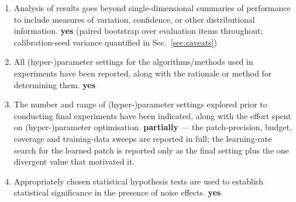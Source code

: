 \documentclass[manuscript, screen, review]{jair}
\begin{document}
\begin{enumerate}
      unsuccessful or unsatisfactory experiments. \textbf{yes} --- rejected
      ideas are reported in Sec.~\ref{sec:negative} with their pre-registered
      promotion rules, and four claims made during the study are explicitly
      retracted.
    \item Analysis of results goes beyond single-dimensional summaries of
      performance to include measures of variation, confidence, or other
      distributional information. \textbf{yes} (paired bootstrap over
      evaluation items throughout; calibration-seed variance quantified in
      Sec.~\ref{sec:caveats})
    \item All (hyper-)parameter settings for the algorithms/methods used in
      experiments have been reported, along with the rationale or method for
      determining them. \textbf{yes}
    \item The number and range of (hyper-)parameter settings explored prior to
      conducting final experiments have been indicated, along with the effort
      spent on (hyper-)parameter optimisation. \textbf{partially} --- the
      patch-precision, budget, coverage and training-data sweeps are reported
      in full; the learning-rate search for the learned patch is reported only
      as the final setting plus the one divergent value that motivated it.
    \item Appropriately chosen statistical hypothesis tests are used to
      establish statistical significance in the presence of noise effects.
      \textbf{yes}
\end{enumerate}
\end{document}
